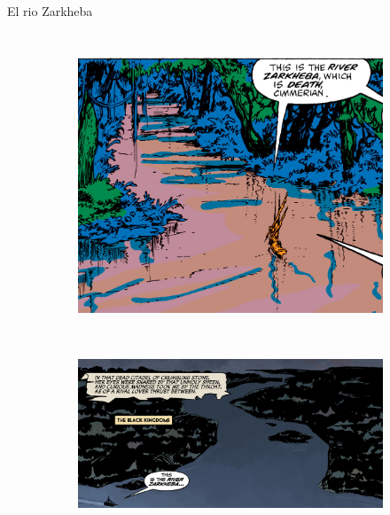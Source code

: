 \begin{frame}{El rio Zarkheba}
\begin{columns}
\begin{figure}[htp]
\begin{subfigure}[b]{0.3\textwidth}
				\includegraphics[width=\textwidth]{img/rio/CTB}
			\end{subfigure}
			\\
			\begin{subfigure}[b]{0.6\textwidth}
				\includegraphics[width=\textwidth]{img/rio/DH}
			\end{subfigure}

		\end{figure}
	\end{columns}
\end{frame}
\note[itemize]{
	\item
}

